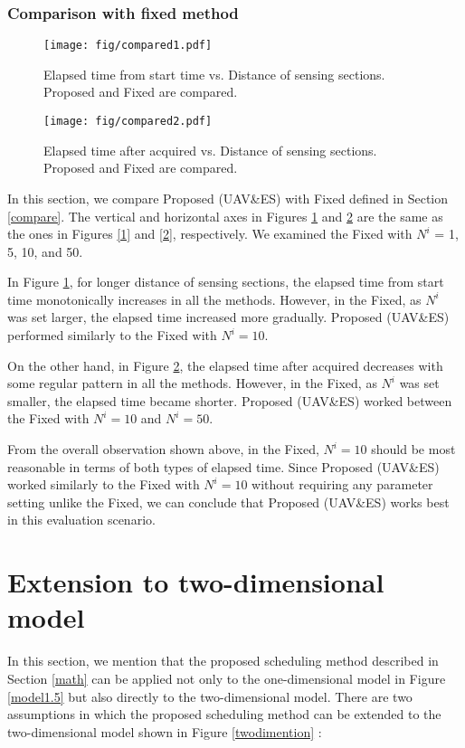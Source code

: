 \documentclass[journal]{IEEEtran}
\begin{document}
\subsubsection{Comparison with fixed method}

\begin{figure}[t]
\begin{center}
\texttt{[image: fig/compared1.pdf]}
\caption{Elapsed time from start time vs. Distance of sensing sections. Proposed and Fixed are compared.}
\label{3}
\end{center}
\end{figure}

\begin{figure}[t]
\begin{center}
\texttt{[image: fig/compared2.pdf]}
\caption{Elapsed time after acquired vs. Distance of sensing sections. Proposed and Fixed are compared.}
\label{4}
\end{center}
\end{figure}

In this section, we compare Proposed (UAV\&ES) with Fixed defined in Section \ref{compare}.
%
The vertical and horizontal axes in Figures \ref{3} and \ref{4} are the same as the ones in Figures \ref{1} and \ref{2}, respectively.
%
We examined the Fixed with $N^i$ = 1, 5, 10, and 50.

%
In Figure \ref{3}, for longer distance of sensing sections, the elapsed time from start time monotonically increases in all the methods.
%
However, in the Fixed, as $N^i$ was set larger, the elapsed time increased more gradually.
%
Proposed (UAV\&ES) performed similarly to the Fixed with $N^i=10$.

On the other hand, in Figure \ref{4}, the elapsed time after acquired decreases with some regular pattern in all the methods.
%
However, in the Fixed, as $N^i$ was set smaller, the elapsed time became shorter.
%
Proposed (UAV\&ES) worked between the Fixed with $N^i=10$ and $N^i=50$.

From the overall observation shown above, in the Fixed, $N^i=10$ should be most reasonable in terms of both types of elapsed time.
%
Since Proposed (UAV\&ES) worked similarly to the Fixed with $N^i=10$ without requiring any parameter setting unlike the Fixed, we can conclude that Proposed (UAV\&ES) works best in this evaluation scenario.


\section{Extension to two-dimensional model}\label{twodi}
In this section, we mention that the proposed scheduling method described in Section \ref{math} can be applied not only to the one-dimensional model in Figure \ref{model1.5} but also directly to the two-dimensional model.
There are two assumptions in which the proposed scheduling method can be extended to the two-dimensional model shown in Figure \ref{twodimention} :
\end{document}
